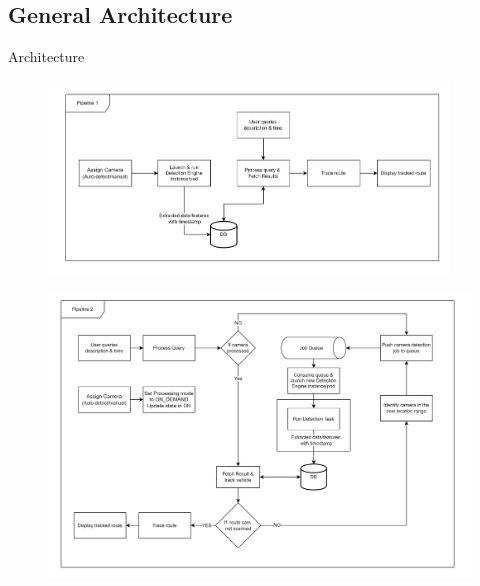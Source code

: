\documentclass{beamer}
\begin{document}
\subsection{General Architecture}
\begin{frame}[allowframebreaks]{Architecture}
	\begin{figure}
		\includegraphics[width=0.95\textwidth]{res/pipeline1.png}
	\end{figure}
	\begin{figure}
		\includegraphics[height=0.8\textheight]{res/pipeline2.png}
	\end{figure}
\end{frame}
\end{document}
